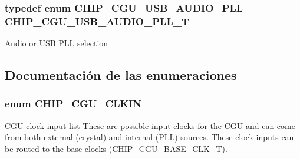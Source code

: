 \subsubsection[{\texorpdfstring{C\+H\+I\+P\+\_\+\+C\+G\+U\+\_\+\+U\+S\+B\+\_\+\+A\+U\+D\+I\+O\+\_\+\+P\+L\+L\+\_\+T}{CHIP_CGU_USB_AUDIO_PLL_T}}]{\setlength{\rightskip}{0pt plus 5cm}typedef enum {\bf C\+H\+I\+P\+\_\+\+C\+G\+U\+\_\+\+U\+S\+B\+\_\+\+A\+U\+D\+I\+O\+\_\+\+P\+LL}  {\bf C\+H\+I\+P\+\_\+\+C\+G\+U\+\_\+\+U\+S\+B\+\_\+\+A\+U\+D\+I\+O\+\_\+\+P\+L\+L\+\_\+T}}\hypertarget{group___c_l_o_c_k__18_x_x__43_x_x_ga839a458a9e1e2a85e68470156c861e6a}{}\label{group___c_l_o_c_k__18_x_x__43_x_x_ga839a458a9e1e2a85e68470156c861e6a}
Audio or U\+SB P\+LL selection 

\subsection{Documentación de las enumeraciones}
\subsubsection[{\texorpdfstring{C\+H\+I\+P\+\_\+\+C\+G\+U\+\_\+\+C\+L\+K\+IN}{CHIP_CGU_CLKIN}}]{\setlength{\rightskip}{0pt plus 5cm}enum {\bf C\+H\+I\+P\+\_\+\+C\+G\+U\+\_\+\+C\+L\+K\+IN}}\hypertarget{group___c_l_o_c_k__18_x_x__43_x_x_ga419aa2b9970dcf4930eb44871da9e377}{}\label{group___c_l_o_c_k__18_x_x__43_x_x_ga419aa2b9970dcf4930eb44871da9e377}


C\+GU clock input list These are possible input clocks for the C\+GU and can come from both external (crystal) and internal (P\+LL) sources. These clock inputs can be routed to the base clocks (\hyperlink{chip__clocks_8h_a31e266dd83cc66eb866d8d051ffd1d45}{C\+H\+I\+P\+\_\+\+C\+G\+U\+\_\+\+B\+A\+S\+E\+\_\+\+C\+L\+K\+\_\+T}). 

